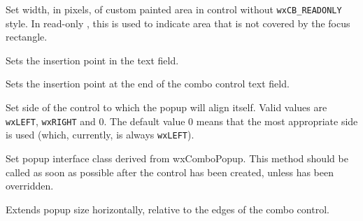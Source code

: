 Set width, in pixels, of custom painted area in control without {\tt wxCB\_READONLY}
style. In read-only , this is used
to indicate area that is not covered by the focus rectangle.


\label{wxcomboctrlsetinsertionpoint}


Sets the insertion point in the text field.




\label{wxcomboctrlsetinsertionpointend}


Sets the insertion point at the end of the combo control text field.


\label{wxcomboctrlsetpopupanchor}


Set side of the control to which the popup will align itself. Valid values are
{\tt wxLEFT}, {\tt wxRIGHT} and $0$. The default value $0$ means that the most appropriate
side is used (which, currently, is always {\tt wxLEFT}).


\label{wxcomboctrlsetpopupcontrol}


Set popup interface class derived from wxComboPopup.
This method should be called as soon as possible after the control
has been created, unless 
has been overridden.


\label{wxcomboctrlsetpopupextents}


Extends popup size horizontally, relative to the edges of the combo control.



